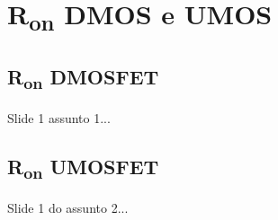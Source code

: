\section{R\textsubscript{on} DMOS e UMOS}

\subsection{R\textsubscript{on} DMOSFET}

\begin{frame}

    Slide 1 assunto 1...

\end{frame}

\subsection{R\textsubscript{on} UMOSFET}

\begin{frame}

    Slide 1 do assunto 2...

\end{frame}

